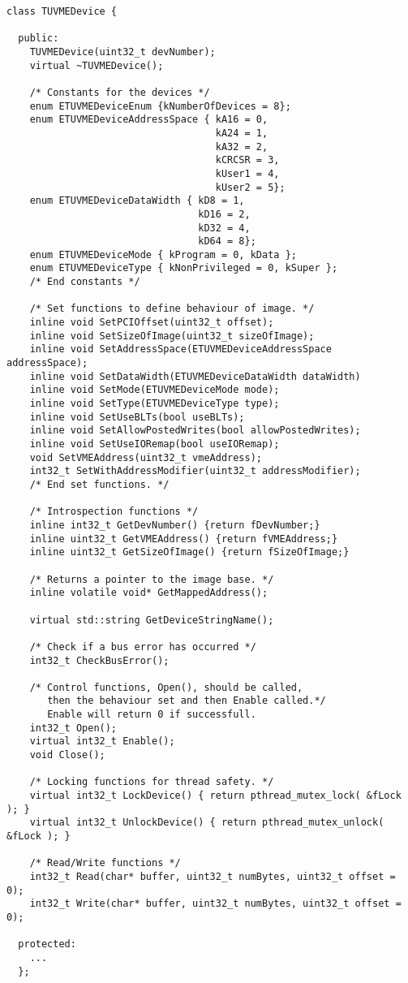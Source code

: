 					\begin{lstlisting}
class TUVMEDevice {

  public:
    TUVMEDevice(uint32_t devNumber);
    virtual ~TUVMEDevice();

    /* Constants for the devices */
    enum ETUVMEDeviceEnum {kNumberOfDevices = 8};
    enum ETUVMEDeviceAddressSpace { kA16 = 0,
                                    kA24 = 1,
                                    kA32 = 2, 
                                    kCRCSR = 3, 
                                    kUser1 = 4, 
                                    kUser2 = 5};
    enum ETUVMEDeviceDataWidth { kD8 = 1,
                                 kD16 = 2,
                                 kD32 = 4,
                                 kD64 = 8};
    enum ETUVMEDeviceMode { kProgram = 0, kData };
    enum ETUVMEDeviceType { kNonPrivileged = 0, kSuper };
    /* End constants */

    /* Set functions to define behaviour of image. */
    inline void SetPCIOffset(uint32_t offset); 
    inline void SetSizeOfImage(uint32_t sizeOfImage);
    inline void SetAddressSpace(ETUVMEDeviceAddressSpace addressSpace); 
    inline void SetDataWidth(ETUVMEDeviceDataWidth dataWidth) 
    inline void SetMode(ETUVMEDeviceMode mode); 
    inline void SetType(ETUVMEDeviceType type);
    inline void SetUseBLTs(bool useBLTs);
    inline void SetAllowPostedWrites(bool allowPostedWrites);
    inline void SetUseIORemap(bool useIORemap);
    void SetVMEAddress(uint32_t vmeAddress); 
    int32_t SetWithAddressModifier(uint32_t addressModifier);
    /* End set functions. */

    /* Introspection functions */
    inline int32_t GetDevNumber() {return fDevNumber;}
    inline uint32_t GetVMEAddress() {return fVMEAddress;}
    inline uint32_t GetSizeOfImage() {return fSizeOfImage;}

    /* Returns a pointer to the image base. */
    inline volatile void* GetMappedAddress(); 

    virtual std::string GetDeviceStringName();

    /* Check if a bus error has occurred */
    int32_t CheckBusError();

    /* Control functions, Open(), should be called,
       then the behaviour set and then Enable called.*/
       Enable will return 0 if successfull. 
    int32_t Open();
    virtual int32_t Enable(); 
    void Close();

    /* Locking functions for thread safety. */
    virtual int32_t LockDevice() { return pthread_mutex_lock( &fLock ); }
    virtual int32_t UnlockDevice() { return pthread_mutex_unlock( &fLock ); }

    /* Read/Write functions */
    int32_t Read(char* buffer, uint32_t numBytes, uint32_t offset = 0);
    int32_t Write(char* buffer, uint32_t numBytes, uint32_t offset = 0);

  protected:
	...
  };

					\end{lstlisting}
